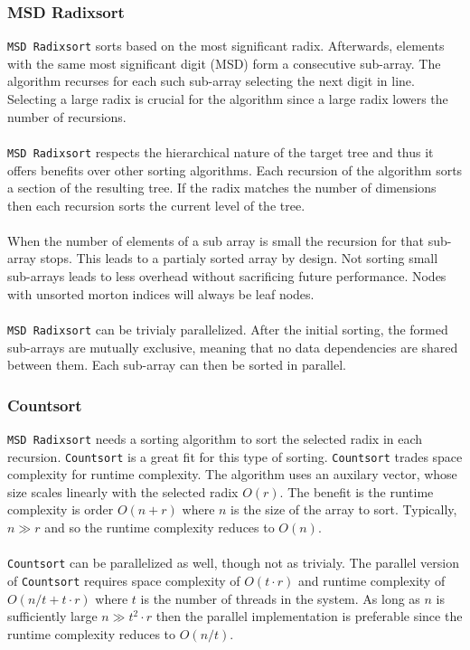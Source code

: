 \documentclass{juliacon}
\begin{document}
\subsubsection{MSD Radixsort}
\verb|MSD Radixsort| sorts based on the most significant radix. Afterwards, elements
with the same most significant digit (MSD) form a consecutive sub-array. The algorithm
recurses for each such sub-array selecting the next digit in line. Selecting a large
radix is crucial for the algorithm since a large radix lowers the number of recursions.
\\\\
\verb|MSD Radixsort| respects the hierarchical nature of the target tree and thus it offers
benefits over other sorting algorithms. Each recursion of the algorithm sorts a section
of the resulting tree. If the radix matches the number of dimensions then each recursion
sorts the current level of the tree.
\\\\
When the number of elements of a sub array is small the recursion for that sub-array stops.
This leads to a partialy sorted array by design. Not sorting small sub-arrays leads to less
overhead without sacrificing future performance. Nodes with unsorted morton indices will
always be leaf nodes.
\\\\
\verb|MSD Radixsort| can be trivialy parallelized. After the initial sorting, the formed
sub-arrays are mutually exclusive, meaning that no data dependencies are shared between
them. Each sub-array can then be sorted in parallel.

\subsubsection{Countsort}
\verb|MSD Radixsort| needs a sorting algorithm to sort the selected radix in each recursion.
\verb|Countsort| is a great fit for this type of sorting. \verb|Countsort| trades
space complexity for runtime complexity. The algorithm uses an auxilary vector, whose
size scales linearly with the selected radix $O(r)$. The benefit is the runtime
complexity is order $O(n + r)$ where $n$ is the size of the array to sort. Typically, $n \gg r$
and so the runtime complexity reduces to $O(n)$.
\\\\
\verb|Countsort| can be parallelized as well, though not as trivialy. The parallel version
of \verb|Countsort| requires space complexity of $O(t\cdot r)$ and runtime complexity of
$O(n/t + t\cdot r)$ where $t$ is the number of threads in the system. As long as $n$ is
sufficiently large $n \gg t^2\cdot r$ then the parallel implementation is preferable since
the runtime complexity reduces to $O(n/t)$.
\end{document}
